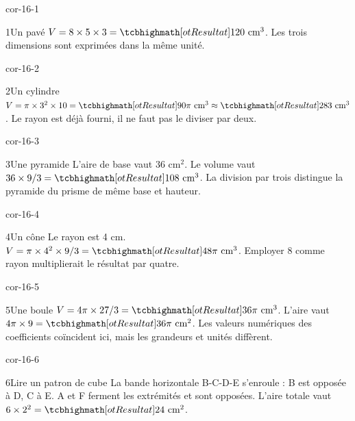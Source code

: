 \clearpage\pagestyle{otMain}\fontsize{11}{15}\selectfont{}
\begin{blocLivre}{cor-16-1}\begin{corrige}{1}{Un pavé}
$V=8\times5\times3=\res{120\text{ cm}^3}$. Les trois dimensions sont exprimées dans la même unité.
\label{fig-cor-16-1}
\end{corrige}\end{blocLivre}
\begin{blocLivre}{cor-16-2}\begin{corrige}{2}{Un cylindre}
$V=\pi\times3^2\times10=\res{90\pi\text{ cm}^3}\approx\res{283\text{ cm}^3}$. Le rayon est déjà fourni, il ne faut pas le diviser par deux.
\label{fig-cor-16-2}
\end{corrige}\end{blocLivre}
\begin{blocLivre}{cor-16-3}\begin{corrige}{3}{Une pyramide}
L’aire de base vaut 36 cm$^2$. Le volume vaut $36\times9/3=\res{108\text{ cm}^3}$. La division par trois distingue la pyramide du prisme de même base et hauteur.
\label{fig-cor-16-3}
\end{corrige}\end{blocLivre}
\begin{blocLivre}{cor-16-4}\begin{corrige}{4}{Un cône}
Le rayon est 4 cm. $V=\pi\times4^2\times9/3=\res{48\pi\text{ cm}^3}$. Employer 8 comme rayon multiplierait le résultat par quatre.
\label{fig-cor-16-4}
\end{corrige}\end{blocLivre}
\begin{blocLivre}{cor-16-5}\begin{corrige}{5}{Une boule}
$V=4\pi\times27/3=\res{36\pi\text{ cm}^3}$. L’aire vaut $4\pi\times9=\res{36\pi\text{ cm}^2}$. Les valeurs numériques des coefficients coïncident ici, mais les grandeurs et unités diffèrent.
\label{fig-cor-16-5}
\end{corrige}\end{blocLivre}
\begin{blocLivre}{cor-16-6}\begin{corrige}{6}{Lire un patron de cube}
La bande horizontale B-C-D-E s’enroule : B est opposée à D, C à E. A et F ferment les extrémités et sont opposées. L’aire totale vaut $6\times2^2=\res{24\text{ cm}^2}$.
\label{fig-cor-16-6}
\end{corrige}\end{blocLivre}
